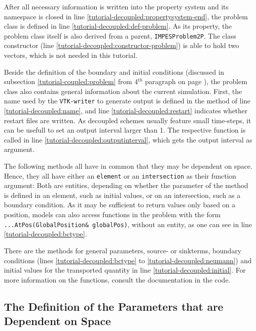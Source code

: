 After all necessary information is written into the property system and
its namespace is closed in line \ref{tutorial-decoupled:propertysystem-end},
the problem class is defined in line \ref{tutorial-decoupled:def-problem}.
As its property, the problem class itself is also derived from a parent,
\texttt{IMPESProblem2P}. The class constructor (line
\ref{tutorial-decoupled:constructor-problem}) is able to hold two vectors,
which is not needed in this tutorial.

Beside the definition of the boundary and initial conditions (discussed in
subsection \ref{tutorial-coupled:problem} from 4$^{th}$ paragraph on page
\pageref{tutorial-coupled:boundaryStart}), the problem class also contains
general information about the current simulation. First, the name used by
the \texttt{VTK-writer} to generate output is defined in the method of line
\ref{tutorial-decoupled:name}, and line \ref{tutorial-decoupled:restart} indicates
whether restart files are written. As decoupled schemes usually feature small
time-steps, it can be usefull to set an output interval larger than 1. The respective
function is called in line \ref{tutorial-decoupled:outputinterval}, which gets the output interval as argument.

The following methods all have in common that they may be dependent on space.
Hence, they all have either an \texttt{element} or an \texttt{intersection} as their
function argument: Both are \Dune entities, depending on whether the parameter of
the method is defined in an element, such as
    initial values, or on an intersection, such as a boundary condition. As it may
    be sufficient to return values only based on a position, \Dumux models can also
    access functions in the problem with the form \mbox{\texttt{...AtPos(GlobalPosition\& globalPos)}},
    without an \Dune entity, as one can see in line \ref{tutorial-decoupled:bctype}.

There are the methods for general parameters, source- or
sinkterms, boundary conditions (lines \ref{tutorial-decoupled:bctype} to
\ref{tutorial-decoupled:neumann}) and initial values for the transported
quantity in line \ref{tutorial-decoupled:initial}. For more information
on the functions, consult the documentation in the code.

\subsection{The Definition of the Parameters that are Dependent on Space}\label{tutorial-decoupled:description-spatialParameters}

